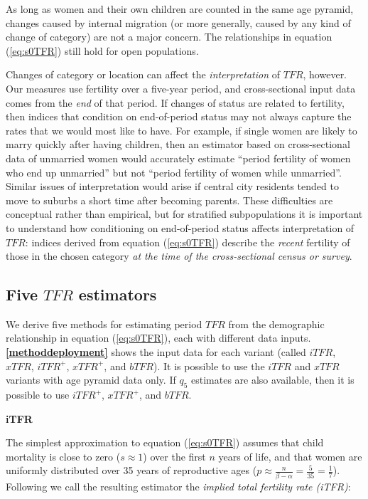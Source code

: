 \documentclass[12pt]{article}
\begin{document}
As long as women and their own children are counted in the same age
pyramid, changes caused by internal migration (or more generally, caused
by any kind of change of category) are not a major concern. The
relationships in equation (\ref{eq:s0TFR}) still hold for open
populations.

Changes of category or location can affect the \textit{interpretation}
of \(TFR\), however. Our measures use fertility over a five-year period,
and cross-sectional input data comes from the \textit{end} of that
period. If changes of status are related to fertility, then indices that
condition on end-of-period status may not always capture the rates that
we would most like to have. For example, if single women are likely to
marry quickly after having children, then an estimator based on
cross-sectional data of unmarried women would accurately estimate
``period fertility of women who end up unmarried'' but not ``period
fertility of women while unmarried''. Similar issues of interpretation
would arise if central city residents tended to move to suburbs a short
time after becoming parents. These difficulties are conceptual rather
than empirical, but for stratified subpopulations it is important to
understand how conditioning on end-of-period status affects
interpretation of \(TFR\): indices derived from equation
(\ref{eq:s0TFR}) describe the \textit{recent} fertility of those in the
chosen category
\textit{at the time of the cross-sectional census or survey}.

\hypertarget{five-tfr-estimators}{%
\subsection{\texorpdfstring{Five \(TFR\)
estimators}{Five TFR estimators}}\label{five-tfr-estimators}}

We derive five methods for estimating period \(TFR\) from the
demographic relationship in equation (\ref{eq:s0TFR}), each with
different data inputs. \textbf{\autoref{methoddeployment}} shows the
input data for each variant (called \(iTFR\), \(xTFR\), \(iTFR^+\),
\(xTFR^+\), and \(bTFR\)). It is possible to use the \(iTFR\) and
\(xTFR\) variants with age pyramid data only. If \(q_5\) estimates are
also available, then it is possible to use \(iTFR^+\), \(xTFR^+\), and
\(bTFR\).

\textbf{iTFR}

The simplest approximation to equation (\ref{eq:s0TFR}) assumes that
child mortality is close to zero (\(s\approx 1\)) over the first \(n\)
years of life, and that women are uniformly distributed over 35 years of
reproductive ages
(\(p\approx \tfrac{n}{\beta-\alpha}=\tfrac{5}{35}=\tfrac{1}{7}\)).
Following \citep{hauer13} we call the resulting estimator the
\emph{implied total fertility rate (iTFR)}:
\end{document}

